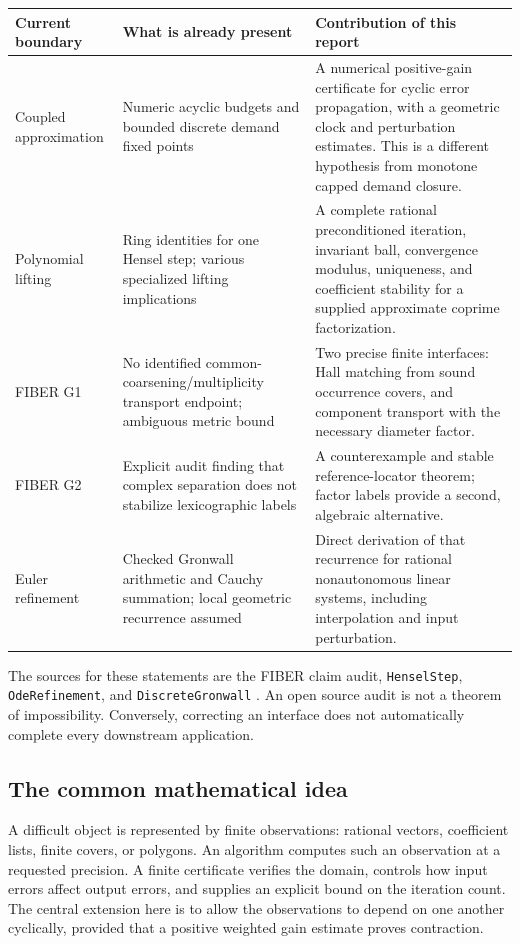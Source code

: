 \begin{longtable}{>{\raggedright\arraybackslash}p{}>{\raggedright\arraybackslash}p{}>{\raggedright\arraybackslash}p{}}
\toprule
Current boundary & What is already present & Contribution of this report\\
\midrule\endhead
Coupled approximation & Numeric acyclic budgets and bounded discrete demand fixed points & A numerical positive-gain certificate for cyclic error propagation, with a geometric clock and perturbation estimates. This is a different hypothesis from monotone capped demand closure.\\
Polynomial lifting & Ring identities for one Hensel step; various specialized lifting implications & A complete rational preconditioned iteration, invariant ball, convergence modulus, uniqueness, and coefficient stability for a supplied approximate coprime factorization.\\
FIBER G1 & No identified common-coarsening/multiplicity transport endpoint; ambiguous metric bound & Two precise finite interfaces: Hall matching from sound occurrence covers, and component transport with the necessary diameter factor.\\
FIBER G2 & Explicit audit finding that complex separation does not stabilize lexicographic labels & A counterexample and stable reference-locator theorem; factor labels provide a second, algebraic alternative.\\
Euler refinement & Checked Gronwall arithmetic and Cauchy summation; local geometric recurrence assumed & Direct derivation of that recurrence for rational nonautonomous linear systems, including interpolation and input perturbation.\\
\bottomrule
\end{longtable}

The sources for these statements are the FIBER claim audit, \texttt{HenselStep}, \nolinkurl{OdeRefinement}, and \nolinkurl{DiscreteGronwall} \cite{repo-fiber,repo-hensel,repo-ode,repo-gronwall}. An open source audit is not a theorem of impossibility. Conversely, correcting an interface does not automatically complete every downstream application.

\subsection{The common mathematical idea}

A difficult object is represented by finite observations: rational vectors, coefficient lists, finite covers, or polygons. An algorithm computes such an observation at a requested precision. A finite certificate verifies the domain, controls how input errors affect output errors, and supplies an explicit bound on the iteration count. The central extension here is to allow the observations to depend on one another cyclically, provided that a positive weighted gain estimate proves contraction.

